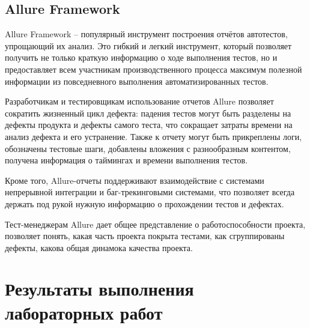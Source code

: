 \documentclass[a4paper]{article}
\begin{document}
    \subsection{Allure Framework}
    Allure Framework – популярный инструмент построения отчётов автотестов, упрощающий их анализ. Это гибкий и легкий инструмент, который позволяет получить не только краткую информацию о ходе выполнения тестов, но и предоставляет всем участникам производственного процесса максимум полезной информации из повседневного выполнения автоматизированных тестов. \par
    Разработчикам и тестировщикам использование отчетов Allure позволяет сократить жизненный цикл дефекта: падения тестов могут быть разделены на дефекты продукта и дефекты самого теста, что сокращает затраты времени на анализ дефекта и его устранение. Также к отчету могут быть прикреплены логи, обозначены тестовые шаги, добавлены вложения с разнообразным контентом, получена информация о таймингах и времени выполнения тестов. \par
    Кроме того, Allure-отчеты поддерживают взаимодействие с системами непрерывной интеграции и баг-трекинговыми системами, что позволяет всегда держать под рукой нужную информацию о прохождении тестов и дефектах. \par
    Тест-менеджерам Allure дает общее представление о работоспособности проекта, позволяет понять, какая часть проекта покрыта тестами, как сгруппированы дефекты, какова общая динамока качества проекта.

    \section{Результаты выполнения лабораторных работ}
\end{document}
